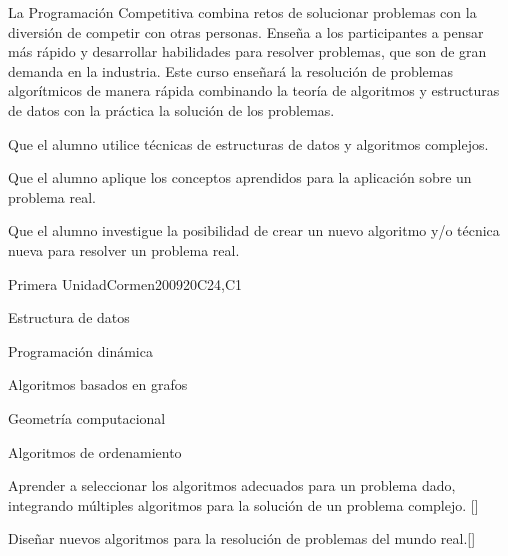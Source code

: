 \begin{syllabus}


\begin{justification}
La Programación Competitiva combina retos de solucionar problemas con la diversión de competir con otras personas. Enseña a los participantes a pensar más rápido y desarrollar habilidades para resolver problemas, que son de gran demanda en la industria. 
Este curso enseñará la resolución de problemas algorítmicos de manera rápida combinando la teoría de algoritmos y estructuras de datos con la práctica la solución de los problemas.
\end{justification}

\begin{goals}
\item Que el alumno utilice técnicas de estructuras de datos y algoritmos complejos.
\item Que el alumno aplique los conceptos aprendidos para la aplicación sobre un problema real.
\item Que el alumno investigue la posibilidad de crear un nuevo algoritmo y/o técnica nueva para resolver un problema real.
\end{goals}

\begin{outcomes}
    \item {}
    \item {}
    \item {}
    \item {}
\end{outcomes}

\begin{competences}
    \item {}
    \item {}
\end{competences}

\begin{unit}{Primera Unidad}{}{Cormen2009}{20}{C24,C1}
\begin{topics}
        \item Estructura de datos
        \item Programación dinámica
        \item Algoritmos basados en grafos
        \item Geometría computacional
        \item Algoritmos de ordenamiento
\end{topics}
\begin{learningoutcomes}
        \item Aprender a seleccionar los algoritmos adecuados para un problema dado, integrando múltiples algoritmos para la solución de un problema complejo. [\Usage]
	\item Diseñar nuevos algoritmos para la resolución de problemas del mundo real.[\Usage]
\end{learningoutcomes}
\end{unit}



\begin{coursebibliography}
\end{coursebibliography}

\end{syllabus}
